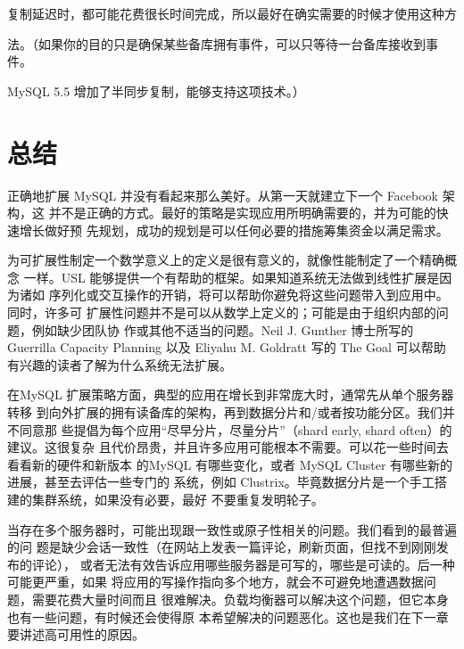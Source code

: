 复制延迟时，都可能花费很长时间完成，所以最好在确实需要的时候才使用这种方

法。（如果你的目的只是确保某些备库拥有事件，可以只等待一台备库接收到事件。

MySQL 5.5 增加了半同步复制，能够支持这项技术。）

\section{总结}
正确地扩展 MySQL 并没有看起来那么美好。从第一天就建立下一个 Facebook 架构，这
并不是正确的方式。最好的策略是实现应用所明确需要的，并为可能的快速增长做好预
先规划，成功的规划是可以任何必要的措施筹集资金以满足需求。

为可扩展性制定一个数学意义上的定义是很有意义的，就像性能制定了一个精确概念
一样。USL 能够提供一个有帮助的框架。如果知道系统无法做到线性扩展是因为诸如
序列化或交互操作的开销，将可以帮助你避免将这些问题带入到应用中。同时，许多可
扩展性问题并不是可以从数学上定义的；可能是由于组织内部的问题，例如缺少团队协
作或其他不适当的问题。Neil J. Gunther 博士所写的Guerrilla Capacity Planning 以及
Eliyahu M. Goldratt 写的 The Goal 可以帮助有兴趣的读者了解为什么系统无法扩展。

在MySQL 扩展策略方面，典型的应用在增长到非常庞大时，通常先从单个服务器转移
到向外扩展的拥有读备库的架构，再到数据分片和/或者按功能分区。我们并不同意那
些提倡为每个应用“尽早分片，尽量分片”（shard early, shard often）的建议。这很复杂
且代价昂贵，并且许多应用可能根本不需要。可以花一些时间去看看新的硬件和新版本
的MySQL 有哪些变化，或者 MySQL Cluster 有哪些新的进展，甚至去评估一些专门的
系统，例如 Clustrix。毕竟数据分片是一个手工搭建的集群系统，如果没有必要，最好
不要重复发明轮子。

当存在多个服务器时，可能出现跟一致性或原子性相关的问题。我们看到的最普遍的问
题是缺少会话一致性（在网站上发表一篇评论，刷新页面，但找不到刚刚发布的评论），
或者无法有效告诉应用哪些服务器是可写的，哪些是可读的。后一种可能更严重，如果
将应用的写操作指向多个地方，就会不可避免地遭遇数据问题，需要花费大量时间而且
很难解决。负载均衡器可以解决这个问题，但它本身也有一些问题，有时候还会使得原
本希望解决的问题恶化。这也是我们在下一章要讲述高可用性的原因。


